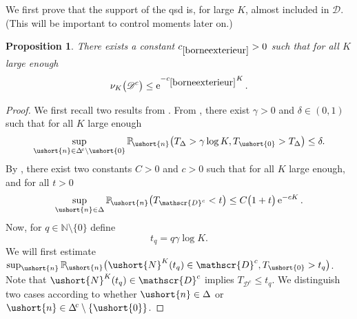 \documentclass[10pt]{amsart}
\let\backslash\setminus
\let\mathcal\mathscr
\numberwithin{equation}{section}
\theoremstyle{plain}
\newtheorem{proposition}[theorem]{Proposition}
\theoremstyle{definition}
\newcommand{\pcte}[1]{c_{\eqref{#1}}}
\newcommand{\proba}{{\mathbb{P}}}
\newcommand{\integers}{\mathbb{N}}
\newcommand{\vecn}{\ushort{n}}
\newcommand{\veczer}{\ushort{0}}
\newcommand{\sDelta}{\Delta}
\newcommand{\leproc}{\ushort{N}^{K}}
\newcommand{\nuk}{\nu_{K}}\let\snuk\nuk
\newcommand{\e}{\operatorname{e}}
\begin{document}
We first prove that the support of the qsd is, for large $K$, almost included in $ \mathcal{D}$. (This will be important to control moments later on.)
\begin{proposition}\label{borneexterieur}
There exists a constant $\pcte{borneexterieur}>0$ such that for all $K$ large enough
\[
\nuk\bigl(\mathcal{D}^{c}\bigr)\le \e^{-\pcte{borneexterieur}K}.
\]
\end{proposition}
\begin{proof}
We first recall two results from \cite{ccm2}.
From \cite[Lem.\,1.5]{ccm2}, there exist $\gamma>0$ and $\delta\in(0,1)$ such that for all $K$ large enough
\begin{equation}\label{res1}
\sup_{\vecn\in\sDelta^{\!c}\backslash\veczer}\proba_{\!\vecn}\bigl(T_{\sDelta}>\gamma\log K,T_{\veczer}>T_{\sDelta}\bigr)\leq \delta.
\end{equation}
By \cite[Sublem.\,5.8]{ccm2}, there exist two constants $C>0$ and $c>0$ such that for all $K$ large enough, and for all $t>0$
\begin{equation}\label{res2}
\sup_{\vecn\in\Delta}\proba_{\!\vecn}\bigl(T_{ \mathcal{D}^{c}}<t\bigr)\leq C\bigl(1+t\bigr) \e^{-c K}.
\end{equation}
Now, for $q\in\integers\backslash \{0\}$ define
\[
t_{q}=q\gamma\log K.
\]
We will first estimate
$\sup_{\vecn}\proba_{\!\vecn}\bigl(\leproc(t_{q})\in \mathcal{D}^{c}, T_{\veczer}>t_q\bigr)$.
Note that $\leproc(t_{q})\in \mathcal{D}^{c}$ implies $T_{ \mathcal{D}^{c}}\leq t_{q}$.
We distinguish two cases according to whether $\vecn\in \Delta$ or $\vecn\in \Delta^{\!c}\backslash\{\veczer\}$.


\end{proof}
\end{document}
